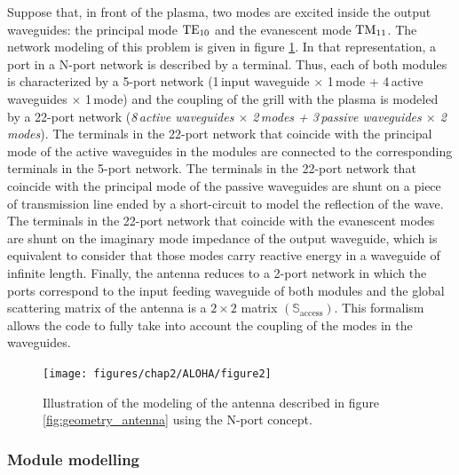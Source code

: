 Suppose that, in front of the plasma, two modes are excited inside the output waveguides: the principal mode ${\mathrm{TE}}_{10}$ and the evanescent mode ${\mathrm{TM}}_{11}$. The network modeling of this problem is given in figure \ref{fig:network_representation}. In that representation, a port in a N-port network is described by a terminal. Thus, each of both modules is characterized by a 5-port network (1\,input waveguide $\times$ 1\,mode + 4\,active waveguides $\times$ 1\,mode) and the coupling of the grill with the plasma is modeled by a 22-port network (\textit{\emph{8\,active waveguides $\times$ 2\,modes + 		3\,passive waveguides $\times$ 2\,modes}}). The terminals in the 22-port network that coincide with the principal mode of the active waveguides in the modules are connected to the corresponding terminals in the 5-port network. The terminals in the 22-port network that coincide with the principal mode of the passive waveguides are shunt on a piece of transmission line ended by a short-circuit to model the reflection of the wave. The terminals in the 22-port network that coincide with the evanescent modes are shunt on the imaginary mode impedance of the output waveguide, which is equivalent to consider that those modes carry reactive energy in a waveguide of infinite length. Finally, the antenna reduces to a 2-port network in which the ports correspond to the input feeding waveguide of both modules and the global scattering matrix of the antenna is a $2\times2$ matrix $\left(\mathbb{S}_{\mbox{access}}\right)$. This formalism allows the code to fully take into account the coupling of the modes in the waveguides.

%
\begin{figure}[h]
	\centering{}\texttt{[image: figures/chap2/ALOHA/figure2]} \caption{Illustration of the modeling of the antenna described in figure \ref{fig:geometry_antenna}
		using the N-port concept.\label{fig:network_representation} }
	
\end{figure}



\subsubsection{Module modelling}\label{sub:module_modeling}

